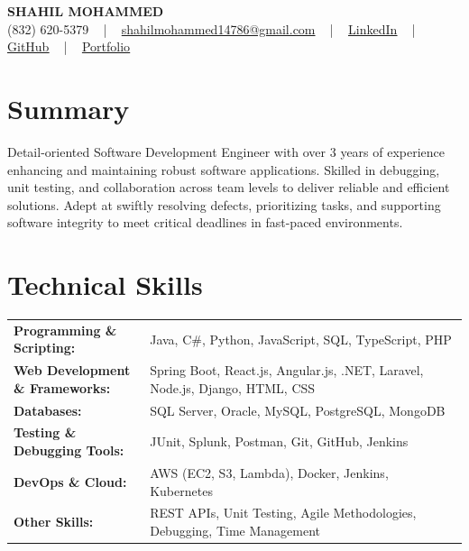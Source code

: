 \documentclass[letterpaper,11pt]{article}
\begin{document}
\begin{center}
    {\fontsize{14pt}{12pt}\selectfont \textbf{\MakeUppercase{Shahil Mohammed}}}\\ \vspace{2pt}
    \fontsize{10pt}{12pt}\selectfont (832) 620-5379 ~ | ~ \href{mailto:shahilmohammed14786@gmail.com}{shahilmohammed14786@gmail.com} ~ | ~  
    \href{https://www.linkedin.com/in/shahil-mohammed-9652931a1/}{\color{blue}\underline{LinkedIn}}  ~ | ~ 
    \href{https://github.com/freakbeast14}{\color{blue}\underline{GitHub}} ~ | ~ 
    \href{https://shahil-mohammed.netlify.app/}{\color{blue}\underline{Portfolio}}
    \vspace{-8pt}
\end{center}

\section{Summary}
\fontsize{9pt}{10pt}\selectfont
Detail-oriented Software Development Engineer with over 3 years of experience enhancing and maintaining robust software applications. Skilled in debugging, unit testing, and collaboration across team levels to deliver reliable and efficient solutions. Adept at swiftly resolving defects, prioritizing tasks, and supporting software integrity to meet critical deadlines in fast-paced environments.
 \vspace{-5pt}
 
\section{Technical Skills}
        \vspace{-14pt}
        \begin{table}[h]
            \fontsize{9pt}{10pt}\selectfont
            \begin{tabular}{p{0.3\linewidth} p{0.7\linewidth}}
                \textbf{Programming \& Scripting:} & Java, C\#, Python, JavaScript, SQL, TypeScript, PHP \\
                \textbf{Web Development \& Frameworks:} & Spring Boot, React.js, Angular.js, .NET, Laravel, Node.js, Django, HTML, CSS \\
                \textbf{Databases:} & SQL Server, Oracle, MySQL, PostgreSQL, MongoDB \\
                \textbf{Testing \& Debugging Tools:} & JUnit, Splunk, Postman, Git, GitHub, Jenkins \\
                \textbf{DevOps \& Cloud:} & AWS (EC2, S3, Lambda), Docker, Jenkins, Kubernetes \\
                \textbf{Other Skills:} & REST APIs, Unit Testing, Agile Methodologies, Debugging, Time Management \\
            \end{tabular}
        \end{table}
 \vspace{-15pt}
 
\end{document}

